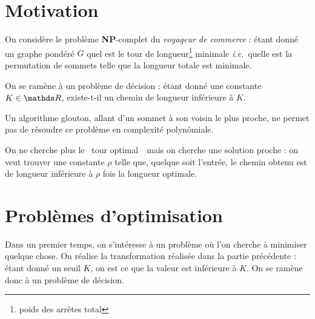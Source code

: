 \setcounter{section}{-1}\relax
\section{Motivation}

On considère le problème \textbf{NP}-complet du \textit{voyageur de commerce} : étant donné un graphe pondéré $G$\/ quel est le tour de longueur\footnote{poids des arrêtes total} minimale \textit{i.e.}\ quelle est la permutation de sommets telle que la longueur totale est minimale.

On se ramène à un problème de décision : étant donné une constante $K \in \R$, existe-t-il un chemin de longueur inférieure à $K$.

Un algorithme glouton, allant d'un sommet à son voisin le plus proche, ne permet pas de résoudre ce problème en complexité polynômiale.

On ne cherche plus le \guillemotleft~tour optimal~\guillemotright\ mais on cherche une solution proche : on veut trouver une constante $\rho$\/ telle que, quelque soit l'entrée, le chemin obtenu est de longueur inférieure à $\rho$\/ fois la longueur optimale.

\section{Problèmes d'optimisation}

Dans un premier temps, on s'intéresse à un problème où l'on cherche à minimiser quelque chose. On réalise la transformation réalisée dans la partie précédente : étant donné un seuil $K$, on est ce que la valeur est inférieure à $K$.
On se ramène donc à un problème de décision.
